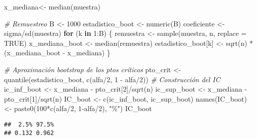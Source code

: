 \documentclass[
]{book}
\newenvironment{Shaded}{\begin{snugshade}}{\end{snugshade}}
\newcommand{\AttributeTok}[1]{\textcolor[rgb]{0.77,0.63,0.00}{#1}}
\newcommand{\CommentTok}[1]{\textcolor[rgb]{0.56,0.35,0.01}{\textit{#1}}}
\newcommand{\ConstantTok}[1]{\textcolor[rgb]{0.00,0.00,0.00}{#1}}
\newcommand{\ControlFlowTok}[1]{\textcolor[rgb]{0.13,0.29,0.53}{\textbf{#1}}}
\newcommand{\DecValTok}[1]{\textcolor[rgb]{0.00,0.00,0.81}{#1}}
\newcommand{\FunctionTok}[1]{\textcolor[rgb]{0.00,0.00,0.00}{#1}}
\newcommand{\NormalTok}[1]{#1}
\newcommand{\OtherTok}[1]{\textcolor[rgb]{0.56,0.35,0.01}{#1}}
\newcommand{\SpecialCharTok}[1]{\textcolor[rgb]{0.00,0.00,0.00}{#1}}
\newcommand{\StringTok}[1]{\textcolor[rgb]{0.31,0.60,0.02}{#1}}
\theoremstyle{break}
\theoremstyle{definition}
\theoremstyle{definition}
\theoremstyle{definition}
\theoremstyle{definition}
\theoremstyle{remark}
\begin{document}
\begin{Shaded}
\begin{Highlighting}[]
\NormalTok{x\_mediana}\OtherTok{\textless{}{-}} \FunctionTok{median}\NormalTok{(muestra)}

\CommentTok{\# Remuestreo}
\NormalTok{B }\OtherTok{\textless{}{-}} \DecValTok{1000}
\NormalTok{estadistico\_boot }\OtherTok{\textless{}{-}} \FunctionTok{numeric}\NormalTok{(B)}
\NormalTok{coeficiente }\OtherTok{\textless{}{-}}\NormalTok{ sigma}\SpecialCharTok{/}\FunctionTok{sd}\NormalTok{(muestra)}
\ControlFlowTok{for}\NormalTok{ (k }\ControlFlowTok{in} \DecValTok{1}\SpecialCharTok{:}\NormalTok{B) \{}
\NormalTok{  remuestra }\OtherTok{\textless{}{-}} \FunctionTok{sample}\NormalTok{(muestra, n, }\AttributeTok{replace =} \ConstantTok{TRUE}\NormalTok{)}
\NormalTok{  x\_mediana\_boot }\OtherTok{\textless{}{-}} \FunctionTok{median}\NormalTok{(remuestra)}
\NormalTok{  estadistico\_boot[k] }\OtherTok{\textless{}{-}} \FunctionTok{sqrt}\NormalTok{(n) }\SpecialCharTok{*}\NormalTok{ (x\_mediana\_boot }\SpecialCharTok{{-}}\NormalTok{ x\_mediana)}
\NormalTok{\}}

\CommentTok{\# Aproximación bootstrap de los ptos críticos}
\NormalTok{pto\_crit }\OtherTok{\textless{}{-}} \FunctionTok{quantile}\NormalTok{(estadistico\_boot, }\FunctionTok{c}\NormalTok{(alfa}\SpecialCharTok{/}\DecValTok{2}\NormalTok{, }\DecValTok{1} \SpecialCharTok{{-}}\NormalTok{ alfa}\SpecialCharTok{/}\DecValTok{2}\NormalTok{))}
\CommentTok{\# Construcción del IC}
\NormalTok{ic\_inf\_boot }\OtherTok{\textless{}{-}}\NormalTok{ x\_mediana }\SpecialCharTok{{-}}\NormalTok{ pto\_crit[}\DecValTok{2}\NormalTok{]}\SpecialCharTok{/}\FunctionTok{sqrt}\NormalTok{(n)}
\NormalTok{ic\_sup\_boot }\OtherTok{\textless{}{-}}\NormalTok{ x\_mediana }\SpecialCharTok{{-}}\NormalTok{ pto\_crit[}\DecValTok{1}\NormalTok{]}\SpecialCharTok{/}\FunctionTok{sqrt}\NormalTok{(n)}
\NormalTok{IC\_boot }\OtherTok{\textless{}{-}} \FunctionTok{c}\NormalTok{(ic\_inf\_boot, ic\_sup\_boot)}
\FunctionTok{names}\NormalTok{(IC\_boot) }\OtherTok{\textless{}{-}} \FunctionTok{paste0}\NormalTok{(}\DecValTok{100}\SpecialCharTok{*}\FunctionTok{c}\NormalTok{(alfa}\SpecialCharTok{/}\DecValTok{2}\NormalTok{, }\DecValTok{1}\SpecialCharTok{{-}}\NormalTok{alfa}\SpecialCharTok{/}\DecValTok{2}\NormalTok{), }\StringTok{"\%"}\NormalTok{)}
\NormalTok{IC\_boot}
\end{Highlighting}
\end{Shaded}

\begin{verbatim}
##  2.5% 97.5% 
## 0.132 0.962
\end{verbatim}
\end{document}
